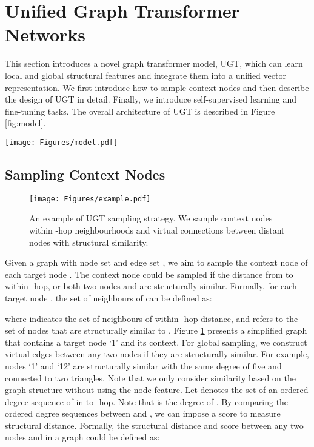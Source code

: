\documentclass[oneside]{article}
\begin{document}
\section{Unified Graph Transformer Networks}

This section introduces a novel graph transformer model, UGT, which can learn local and global structural features and integrate them into a unified vector representation.
We first introduce how to sample context nodes and then describe the design of UGT in detail.
Finally, we introduce self-supervised learning and fine-tuning tasks.
The overall architecture of UGT is described in Figure \ref{fig:model}.


\begin{figure*}[t]
\centering 
  \texttt{[image: Figures/model.pdf]}
  \caption{The overall architecture of UGT.
  UGT is composed of main blocks, including sampling context nodes, building modules , , and , and pre-training blocks. 
  The learned representations then could be used for various downstream tasks.
}  
  \label{fig:model}
\end{figure*}






\subsection{Sampling Context Nodes } 

\begin{figure}[t]
\centering 
  \texttt{[image: Figures/example.pdf]}
  \caption{An example of UGT sampling strategy. 
  We sample context nodes within -hop neighbourhoods and virtual connections between distant nodes with structural similarity. }
\label{fig:sample}
\end{figure}

Given a graph  with node set  and edge set , we aim to sample the context node  of each target node .
The context node  could be sampled if the distance from  to  within -hop, or both two nodes  and  are structurally similar.
Formally, for each target node , the set of neighbours of  can be defined as:

where  indicates the set of neighbours of  within -hop distance, and  refers to the set of nodes that are structurally similar to .
Figure \ref{fig:sample} presents a simplified graph that contains a target node `1' and its context.
For global sampling, we construct virtual edges between any two nodes if they are structurally similar.
For example, nodes `1' and `12' are structurally similar with the same degree of five and connected to two triangles.
Note that we only consider similarity based on the graph structure without using the node feature.
Let  denotes the set of an ordered degree sequence of  in  to -hop.
Note that  is the degree of .
By comparing the ordered degree sequences between  and , we can impose a score to measure structural distance.
Formally, the structural distance and score between any two nodes  and  in a graph could be defined as:
\end{document}

